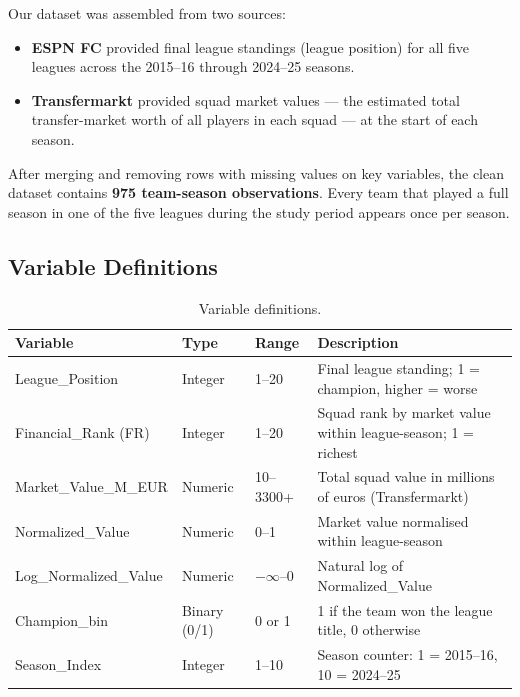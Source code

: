 \documentclass[11pt, a4paper]{article}
\begin{document}
Our dataset was assembled from two sources:

\begin{itemize}
  \item \textbf{ESPN FC} provided final league standings (league position) for all
        five leagues across the 2015--16 through 2024--25 seasons.
  \item \textbf{Transfermarkt} provided squad market values --- the estimated total
        transfer-market worth of all players in each squad --- at the start of each
        season.
\end{itemize}

After merging and removing rows with missing values on key variables, the clean
dataset contains \textbf{975 team-season observations}. Every team that played a
full season in one of the five leagues during the study period appears once per
season.

\subsection{Variable Definitions}

\begin{table}[H]
  \centering
  \small
  \caption{Variable definitions.}
  \label{tab:vardefs}
  \begin{tabular}{>{\ttfamily}p{3.6cm} p{1.4cm} p{1.6cm} p{7.2cm}}
    \toprule
    \rowcolor{NavyBlue}
    \color{white}\textbf{Variable} &
    \color{white}\textbf{Type} &
    \color{white}\textbf{Range} &
    \color{white}\textbf{Description} \\
    \midrule
    League\_Position    & Integer      & 1--20     & Final league standing; 1 = champion, higher = worse \\
    \rowcolor{RowA}
    Financial\_Rank (FR) & Integer     & 1--20     & Squad rank by market value within league-season; 1 = richest \\
    Market\_Value\_M\_EUR & Numeric    & 10--3300+ & Total squad value in millions of euros (Transfermarkt) \\
    \rowcolor{RowA}
    Normalized\_Value   & Numeric      & 0--1      & Market value normalised within league-season \\
    Log\_Normalized\_Value & Numeric   & $-\infty$--0 & Natural log of Normalized\_Value \\
    \rowcolor{RowA}
    Champion\_bin       & Binary (0/1) & 0 or 1   & 1 if the team won the league title, 0 otherwise \\
    Season\_Index       & Integer      & 1--10     & Season counter: 1 = 2015--16, 10 = 2024--25 \\
    \bottomrule
  \end{tabular}
\end{table}
\end{document}
